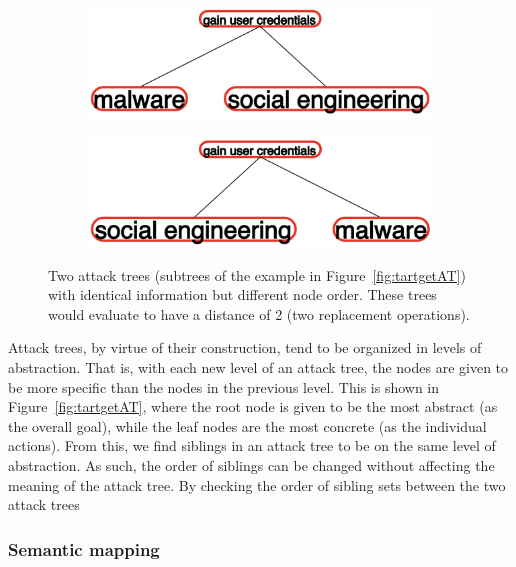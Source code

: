 \begin{figure}
    \begin{subfigure}{.45\linewidth}
        \includegraphics[width=\linewidth]{img/NodeFlip1.png}
    \end{subfigure}
    \begin{subfigure}{.45\linewidth}
        \includegraphics[width=\linewidth]{img/NodeFlip2.png}
    \end{subfigure}
    \caption{Two attack trees (subtrees of the example in Figure~\ref{fig:tartgetAT}) with identical information but different node order. These trees would evaluate to have a distance of 2 (two replacement operations).}
    \label{fig:nodeflipping}
\end{figure}

Attack trees, by virtue of their construction, tend to be organized in levels of abstraction. That is, with each new level of an attack tree, the nodes are given to be more specific than the nodes in the previous level. This is shown in Figure~\ref{fig:tartgetAT}, where the root node is given to be the most abstract (as the overall goal), while the leaf nodes are the most concrete (as the individual actions). From this, we find siblings in an attack tree to be on the same level of abstraction. As such, the order of siblings can be changed without affecting the meaning of the attack tree. By checking the order of sibling sets between the two attack trees




\subsubsection{Semantic mapping}

